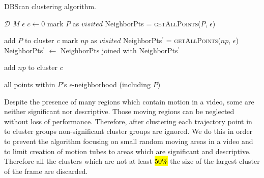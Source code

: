 \begin{algorithm}
 \caption{DBScan clustering algorithm.}
   \label{alg:Clustering algorithm}
    \begin{algorithmic}[1]
    \Require  $\mathcal{D}$ 
    \Require $M$ 
    \Require $\epsilon$ 
        \State $c \leftarrow 0$ 
	  \EndIf
            \State mark $P$ as $visited$
            \State NeighborPts = \textsc{getAllPoints}($P$, $\epsilon$)
          \Else
          \EndIf
        \EndFor

	\State add $P$ to cluster $c$
	    \State mark $np$ as $visited$
	    \State NeighborPts$^\prime$ = \textsc{getAllPoints}($np$, $\epsilon$)
            \State NeighborPts$^\prime$ $\leftarrow$ NeighborPts joined with NeighborPts$^\prime$
            \EndIf
	
	  \EndIf
         \State add $np$ to cluster $c$
         \EndIf
	\EndFor
       \EndFunction

       \Return all points within $P$'s $\epsilon$-neighborhood (including $P$)
       \EndFunction
\end{algorithmic}

\end{algorithm}


Despite the presence of many regions which contain motion in a video, some are neither significant nor descriptive.
Those moving regions can be neglected without loss of performance. Therefore, after clustering each trajectory point in to cluster groups non-significant cluster groups are ignored.
We do this in order to prevent the algorithm focusing on small random moving areas in a video and to limit creation of motion tubes to areas which are significant and descriptive.
Therefore all the clusters which are not at least \hl{50\%} the size of the largest cluster of the frame are discarded.

